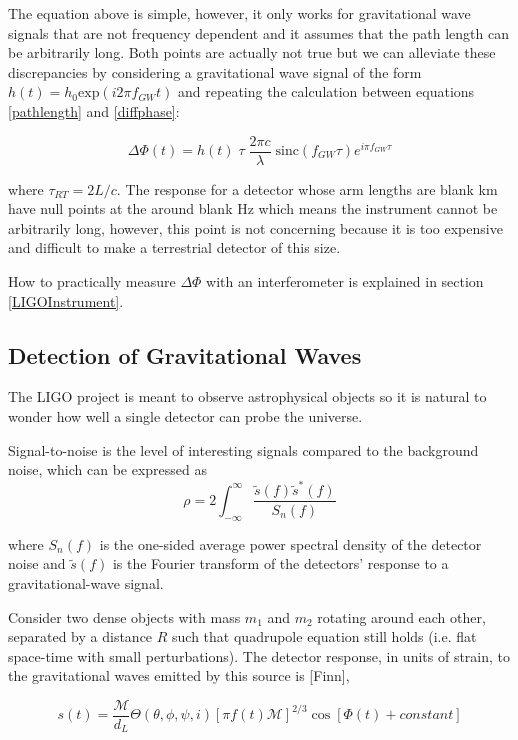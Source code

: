 	The equation above is simple, however, it only works for gravitational wave signals that are not frequency dependent and it assumes that the path length can be arbitrarily long. Both points are actually not true but we can alleviate these discrepancies by considering a gravitational wave signal of the form $h(t) = h_0 \text{exp} (i 2 \pi f_{GW} t)$  and repeating the calculation between equations \ref{pathlength} and \ref{diffphase}:
	
	\begin{equation}\label{gwsinc}
	\Delta \Phi (t) = h(t) \; \tau \; \frac{2 \pi c}{\lambda} \; \text{sinc}(f_{GW} \tau) e^{i \pi f_{GW} \tau}
	\end{equation}
	
	where $\tau_{RT} = 2L/c$.  The response for a detector whose arm lengths are blank km have null points at the around blank Hz which means the instrument cannot be arbitrarily long, however, this point is not concerning because it is too expensive and difficult to make a terrestrial detector of this size.
	
	How to practically measure $\Delta \Phi$ with an interferometer is explained in section \ref{LIGOInstrument}.

	\subsection{Detection of Gravitational Waves}
	The LIGO project is meant to observe astrophysical objects so it is natural to wonder how well a single detector can probe the universe.  
	
	Signal-to-noise is the level of interesting signals compared to the background noise, which can be expressed as
	\begin{equation}\label{SNR}
	\rho = 2 \int_{-\infty}^{\infty} \frac{ \tilde{s}(f) \tilde{s}^*(f) }{S_n(f)}
	\end{equation}
	
	where ${S_n(f)}$ is the one-sided average power spectral density of the detector noise and $\tilde{s}(f)$ is the Fourier transform of the detectors' response to a gravitational-wave signal.
	
	Consider two dense objects with mass $m_1$ and $m_2$ rotating around each other, separated by a distance $R$ such that quadrupole equation still holds (i.e. flat space-time with small perturbations). The detector response, in units of strain, to the gravitational waves emitted by this source is [Finn],
	
	\begin{equation}\label{inspiralsignal}
	s(t) = \frac{\mathcal{M}}{d_L} \Theta(\theta,\phi,\psi,i) [\pi f(t) \mathcal{M}]^{2/3} \cos[\Phi(t) + constant]
	\end{equation}
	
